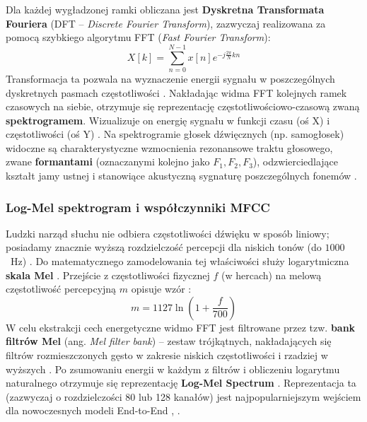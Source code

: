 Dla każdej wygładzonej ramki obliczana jest \textbf{Dyskretna Transformata Fouriera} (DFT -- \textit{Discrete Fourier Transform}), zazwyczaj realizowana za pomocą szybkiego algorytmu FFT (\textit{Fast Fourier Transform}):
\begin{equation}
    X[k] = \sum_{n=0}^{N-1} x[n] e^{-j \frac{2\pi}{N} kn}
\end{equation}
Transformacja ta pozwala na wyznaczenie energii sygnału w poszczególnych dyskretnych pasmach częstotliwości \cite[s.~351]{jurafsky2026}. Nakładając widma FFT kolejnych ramek czasowych na siebie, otrzymuje się reprezentację częstotliwościowo-czasową zwaną \textbf{spektrogramem}. Wizualizuje on energię sygnału w funkcji czasu (oś X) i częstotliwości (oś Y) \cite[s.~345]{jurafsky2026}. Na spektrogramie głosek dźwięcznych (np. samogłosek) widoczne są charakterystyczne wzmocnienia rezonansowe traktu głosowego, zwane \textbf{formantami} (oznaczanymi kolejno jako $F_1, F_2, F_3$), odzwierciedlające kształt jamy ustnej i stanowiące akustyczną sygnaturę poszczególnych fonemów \cite[s.~345--347]{jurafsky2026}.

\subsubsection{Log-Mel spektrogram i współczynniki MFCC}
Ludzki narząd słuchu nie odbiera częstotliwości dźwięku w sposób liniowy; posiadamy znacznie wyższą rozdzielczość percepcji dla niskich tonów (do $1000$~Hz) \cite[s.~351]{jurafsky2026}. Do matematycznego zamodelowania tej właściwości służy logarytmiczna \textbf{skala Mel} \cite[s.~351]{jurafsky2026}. Przejście z częstotliwości fizycznej $f$ (w hercach) na melową częstotliwość percepcyjną $m$ opisuje wzór \cite[s.~352]{jurafsky2026}:
\begin{equation}
    m = 1127 \ln\left(1 + \frac{f}{700}\right)
\end{equation}
W celu ekstrakcji cech energetyczne widmo FFT jest filtrowane przez tzw. \textbf{bank filtrów Mel} (ang. \textit{Mel filter bank}) -- zestaw trójkątnych, nakładających się filtrów rozmieszczonych gęsto w zakresie niskich częstotliwości i rzadziej w wyższych \cite[s.~351--352]{jurafsky2026}. Po zsumowaniu energii w każdym z filtrów i obliczeniu logarytmu naturalnego otrzymuje się reprezentację \textbf{Log-Mel Spectrum} \cite[s.~352]{jurafsky2026}. Reprezentacja ta (zazwyczaj o rozdzielczości 80 lub 128 kanałów) jest najpopularniejszym wejściem dla nowoczesnych modeli End-to-End \cite[s.~352]{jurafsky2026}, \cite[s.~315]{pondel2024e2e}.

